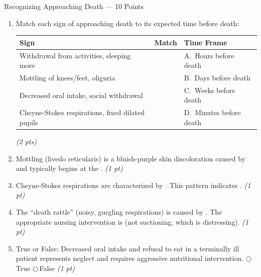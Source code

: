 \documentclass[11pt,letterpaper]{article}
\newcommand{\blank}[1][3cm]{\underline{\hspace{#1}}}
\begin{document}
\begin{diagbox}{Recognizing Approaching Death --- 10 Points}

\begin{enumerate}[leftmargin=1.5em, label=\textbf{\arabic*.},start=151]

  \item Match each sign of approaching death to its expected time before death:

  \vspace{0.2cm}
  \begin{center}
  \renewcommand{\arraystretch}{1.7}
  \begin{tabular}{|p{5cm}|p{1.5cm}|p{4.5cm}|}
  \hline
  \textbf{Sign} & \textbf{Match} & \textbf{Time Frame} \\
  \hline
  Withdrawal from activities, sleeping more & \blank[1.2cm] & A.\ Hours before death \\
  \hline
  Mottling of knees/feet, oliguria & \blank[1.2cm] & B.\ Days before death \\
  \hline
  Decreased oral intake, social withdrawal & \blank[1.2cm] & C.\ Weeks before death \\
  \hline
  Cheyne-Stokes respirations, fixed dilated pupils & \blank[1.2cm] & D.\ Minutes before death \\
  \hline
  \end{tabular}
  \end{center}
  \hfill\textit{(2 pts)}

  \item Mottling (livedo reticularis) is a bluish-purple skin discoloration caused by
        \blank[4cm] and typically begins at the \blank[3cm].
        \hfill\textit{(1 pt)}

  \item Cheyne-Stokes respirations are characterized by \blank[5cm].
        This pattern indicates \blank[4cm].
        \hfill\textit{(1 pt)}

  \item The ``death rattle'' (noisy, gurgling respirations) is caused by
        \blank[5cm].  The appropriate nursing intervention is
        \blank[5cm] (not suctioning, which is distressing).
        \hfill\textit{(1 pt)}

  \item True or False: Decreased oral intake and refusal to eat in a terminally ill
        patient represents neglect and requires aggressive nutritional intervention.
        \quad$\bigcirc$\,True \quad$\bigcirc$\,False
        \hfill\textit{(1 pt)}


\end{enumerate}
\end{diagbox}
\end{document}
